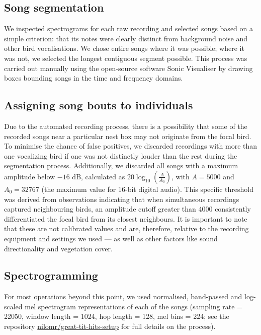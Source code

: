 \subsection{Song segmentation}

We inspected spectrograms for each raw recording and selected songs based on a simple criterion: that its notes were clearly distinct from background noise and other bird vocalisations. We chose entire songs where it was possible; where it was not, we selected the longest contiguous segment possible. This process was carried out manually using the open-source software Sonic Visualiser \parencite{cannam2010} by drawing boxes bounding songs in the time and frequency domains.

\subsection{Assigning song bouts to individuals}

Due to the automated recording process, there is a possibility that some of the recorded songs near a particular nest box may not originate from the focal bird. To minimise the chance of false positives, we discarded recordings with more than one vocalizing bird if one was not distinctly louder than the rest during the segmentation process. Additionally, we discarded all songs with a maximum amplitude below $-16$ dB, calculated as $20 \log_{10}\left(\frac{A}{A_0}\right)$, with $A = 5000$ and $A_0 = 32767$ (the maximum value for 16-bit digital audio). This specific threshold was derived from observations indicating that when simultaneous recordings captured neighbouring birds, an amplitude cutoff greater than 4000 consistently differentiated the focal bird from its closest neighbours. It is important to note that these are not calibrated values and are, therefore, relative to the recording equipment and settings we used --- as well as other factors like sound directionality and vegetation cover.

\subsection{Spectrogramming}

For most operations beyond this point, we used normalised, band-passed and log-scaled mel spectrogram representations of each of the songs (sampling rate = 22050,  window length = 1024, hop length = 128, mel bins = 224; see the repository \href{https://github.com/nilomr/great-tit-hits-setup}{nilomr/great-tit-hits-setup} for full details on the process).

